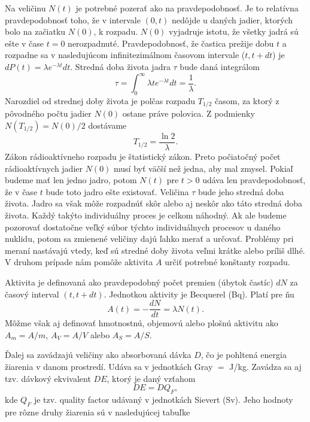 \documentclass[../../main.tex]{subfiles}
\begin{document}
Na veličinu $N(t)$ je potrebné pozerať ako na pravdepodobnosť. Je to relatívna pravdepodobnosť toho, že v intervale $(0,t)$ nedôjde u daných jadier, ktorých bolo na začiatku $N(0)$, k rozpadu. $N(0)$ vyjadruje istotu, že všetky jadrá sú ešte v čase $t=0$ nerozpadnuté. Pravdepodobnosť, že častica prežije dobu $t$ a rozpadne sa v nasledujúcom infinitezimálnom časovom intervale ($t,t+dt$) je $dP(t)= \lambda e^{-\lambda t}dt$. Stredná doba života jadra $\tau$ bude daná integrálom
\begin{equation}
\tau = \int_0^{\infty} \lambda te^{-\lambda t}dt = \frac{1}{\lambda}.
\end{equation}
Narozdiel od strednej doby života je polčas rozpadu $T_{1/2}$ časom, za ktorý z pôvodného počtu jadier $N(0)$ ostane práve polovica. Z podmienky $N(T_{1/2}) = N(0)/2$ dostávame 
\begin{equation}
T_{1/2} = \frac{\ln2}{\lambda}.
\end{equation}
Zákon rádioaktívneho rozpadu je štatistický zákon. Preto počiatočný počet rádioaktívnych jadier $N(0)$ musí byť väčší než jedna, aby mal zmysel. Pokiaľ budeme mať len jedno jadro, potom $N(t)$ pre $t>0$ udáva len pravdepodobnosť, že v čase $t$ bude toto jadro ešte existovať. Veličina $\tau$ bude jeho stredná doba života. Jadro sa však môže rozpadnúť skôr alebo aj neskôr ako táto stredná doba života. Každý takýto individuálny proces je celkom náhodný. Ak ale budeme pozorovať dostatočne veľký súbor týchto individuálnych procesov u daného nuklidu, potom sa zmienené veličiny dajú ľahko merať a určovať. Problémy pri meraní nastávajú vtedy, keď sú stredné doby života veľmi krátke alebo príliš dlhé. V druhom prípade nám pomôže aktivita $A$ určiť potrebné konštanty rozpadu.

Aktivita je definovaná ako pravdepodobný počet premien (úbytok častíc) $dN$ za časový interval $(t,t+dt)$. Jednotkou aktivity je Becquerel (Bq). Platí pre ňu
\begin{equation}
A(t) = -\frac{dN}{dt} = \lambda N(t). 
\end{equation}
Môžme však aj definovať hmotnostnú, objemovú alebo plošnú aktivitu ako $A_m = A/m$, $A_V = A/V$ alebo $A_S = A/S$.
 
Ďalej sa zavádzajú veličiny ako absorbovaná dávka $D$, čo je pohltená energia žiarenia v danom prostredí. Udáva sa v jednotkách Gray $=$ J/kg. Zavádza sa aj tzv. dávkový ekvivalent $DE$, ktorý je daný vzťahom 
$$ DE = D Q_F,$$
kde $Q_F$ je tzv. quality factor udávaný v jednotkách Sievert (Sv). Jeho hodnoty pre rôzne druhy žiarenia sú v nasledujúcej tabuľke
\end{document}
